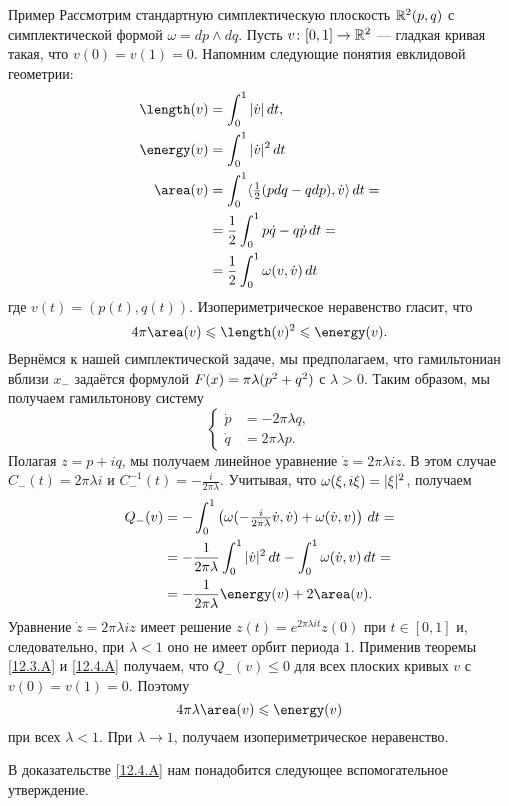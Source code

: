 \begin{ex*}{Пример}
Рассмотрим стандартную симплектическую плоскость $\mathbb{R}^2(p, q)$ с симплектической формой $\omega = dp \wedge dq$.
Пусть $v\colon [0, 1] \to\mathbb{R}^2$ --- гладкая кривая такая, что $v(0)=v(1)=0$.
Напомним следующие понятия евклидовой геометрии: 
\begin{align*}
\length(v)&=\int_0^1|\dot v|\,\d t,
\\
\energy(v)&=\int_0^1|\dot v|^2\,\d t
\\
\area(v)&=\int_0^1\langle \tfrac12(p\d q-q\d p),\dot v\rangle\,\d t=
\\
&=\frac12\int_0^1 p\dot q-q\dot p\,\d t=
\\
&=\frac12\int_0^1\omega(v,\dot v)\,\d t
\end{align*}
где $v(t) = (p(t), q(t))$.
Изопериметрическое неравенство гласит, что
\[4\pi\area(v)\le\length(v)^2\le \energy(v).\]
Вернёмся к нашей симплектической задаче, мы предполагаем, что гамильтониан вблизи $x_-$ задаётся формулой $F(x) = \pi \lambda(p^2 \z+ q^2)$ с $\lambda > 0$.
Таким образом, мы получаем гамильтонову систему 
\[
\begin{cases}
\dot p &= -2\pi\lambda q,
\\
\dot q &= 2\pi\lambda p.
\end{cases}
\]
Полагая $z = p + iq$, мы получаем линейное уравнение $\dot z = 2\pi \lambda iz$.
В этом случае $C_-(t) = 2\pi\lambda i$ и $C_-^{-1}(t) = -\frac i{2\pi\lambda}$.
Учитывая, что $\omega(\xi,i\xi) \z= |\xi|^2$, получаем
\begin{align*}
Q_-(v)&=-\int_0^1\left(\omega(-\tfrac i{2\pi\lambda}\dot v,\dot v)+\omega(\dot v, v)\right)\,dt=
\\
&=-\frac 1{2\pi\lambda}\int_0^1|\dot v|^2\,dt-\int_0^1\omega(\dot v,v)\,dt=
\\
&=-\frac 1{2\pi\lambda}\energy(v)+2\area(v).
\end{align*}
Уравнение $\dot z = 2\pi\lambda iz$ имеет решение $z(t) = e^{2\pi\lambda it}z(0)$ при $t \in [0, 1]$ и, следовательно, при $\lambda < 1$ оно не имеет орбит периода $1$.
Применив теоремы \ref{12.3.A} и \ref{12.4.A} получаем, что $Q_-(v)\le 0$ для всех плоских кривых $v$ с $v(0) = v(1) = 0$.
Поэтому 
\[4\pi \lambda \area(v) \le \energy (v)\]
при всех $\lambda < 1$.
При $\lambda\to1$, получаем изопериметрическое неравенство.
\end{ex*}

В доказательстве \ref{12.4.A} нам понадобится следующее вспомогательное утверждение.

